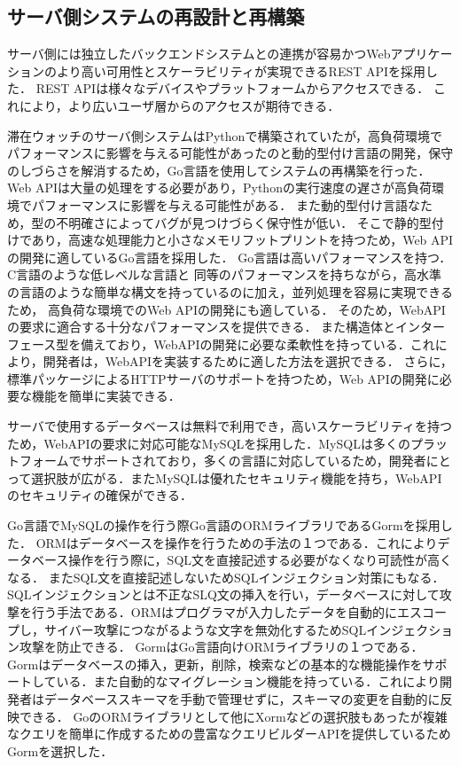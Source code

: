 



\subsection{サーバ側システムの再設計と再構築}\label{4.1.1}
サーバ側には独立したバックエンドシステムとの連携が容易かつWebアプリケーションのより高い可用性とスケーラビリティが実現できるREST APIを採用した．
REST APIは様々なデバイスやプラットフォームからアクセスできる．
これにより，より広いユーザ層からのアクセスが期待できる．


滞在ウォッチのサーバ側システムはPythonで構築されていたが，高負荷環境でパフォーマンスに影響を与える可能性があったのと動的型付け言語の開発，保守のしづらさを解消するため，Go言語を使用してシステムの再構築を行った．
Web APIは大量の処理をする必要があり，Pythonの実行速度の遅さが高負荷環境でパフォーマンスに影響を与える可能性がある．
また動的型付け言語なため，型の不明確さによってバグが見つけづらく保守性が低い．
そこで静的型付けであり，高速な処理能力と小さなメモリフットプリントを持つため，Web APIの開発に適しているGo言語を採用した．
Go言語は高いパフォーマンスを持つ．C言語のような低レベルな言語と
同等のパフォーマンスを持ちながら，高水準の言語のような簡単な構文を持っているのに加え，並列処理を容易に実現できるため，
高負荷な環境でのWeb APIの開発にも適している．
そのため，WebAPIの要求に適合する十分なパフォーマンスを提供できる．
また構造体とインターフェース型を備えており，WebAPIの開発に必要な柔軟性を持っている．これにより，開発者は，WebAPIを実装するために適した方法を選択できる．
さらに，標準パッケージによるHTTPサーバのサポートを持つため，Web APIの開発に必要な機能を簡単に実装できる．

サーバで使用するデータベースは無料で利用でき，高いスケーラビリティを持つため，WebAPIの要求に対応可能なMySQLを採用した．MySQLは多くのプラットフォームでサポートされており，多くの言語に対応しているため，開発者にとって選択肢が広がる．またMySQLは優れたセキュリティ機能を持ち，WebAPIのセキュリティの確保ができる．

Go言語でMySQLの操作を行う際Go言語のORMライブラリであるGormを採用した．
ORMはデータベースを操作を行うための手法の１つである．これによりデータベース操作を行う際に，SQL文を直接記述する必要がなくなり可読性が高くなる．
またSQL文を直接記述しないためSQLインジェクション対策にもなる．SQLインジェクションとは不正なSLQ文の挿入を行い，データベースに対して攻撃を行う手法である．ORMはプログラマが入力したデータを自動的にエスコープし，サイバー攻撃につながるような文字を無効化するためSQLインジェクション攻撃を防止できる．
GormはGo言語向けORMライブラリの１つである．Gormはデータベースの挿入，更新，削除，検索などの基本的な機能操作をサポートしている．また自動的なマイグレーション機能を持っている．これにより開発者はデータベーススキーマを手動で管理せずに，スキーマの変更を自動的に反映できる．
GoのORMライブラリとして他にXormなどの選択肢もあったが複雑なクエリを簡単に作成するための豊富なクエリビルダーAPIを提供しているためGormを選択した．

